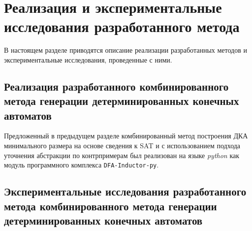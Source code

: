 
\section{Реализация и экспериментальные исследования разработанного метода}
\label{sec:cegar:results}

В настоящем разделе приводятся описание реализации разработанных методов и экспериментальные исследования, проведенные с ними.


\subsection{Реализация разработанного комбинированного метода генерации детерминированных конечных автоматов}
\label{sec:cegar:results:impl}

Предложенный в предыдущем разделе комбинированный метод построения ДКА минимального размера на основе сведения к SAT и с использованием подхода уточнения абстракции по контрпримерам был реализован на языке \emph{python} как модуль программного комплекса \texttt{DFA-Inductor-py}.


\subsection{Экспериментальные исследования разработанного метода комбинированного метода генерации детерминированных конечных автоматов}
\label{sec:cegar:results:cegar}

